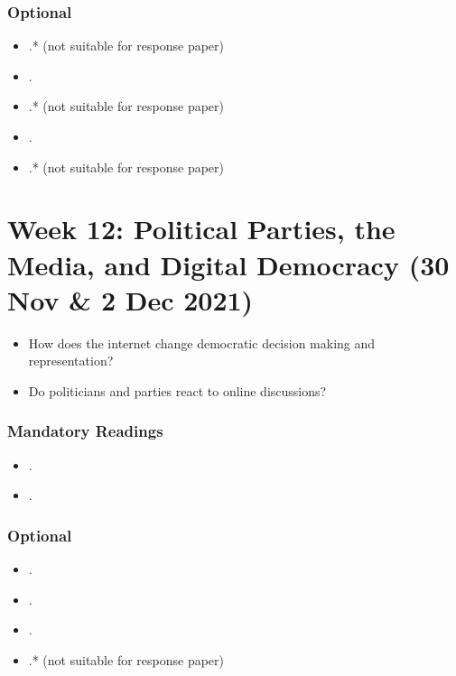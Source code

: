 \documentclass[abstract=on,parskip=full,headings=standardclasses,fontsize=11pt,paper=a4]{scrartcl}
\begin{document}
\subsubsection*{Optional}
\begin{itemize}
\item {}.* (not suitable for response paper)
\item {}.
\item {}.* (not suitable for response paper)
\item {}.
\item {}.* (not suitable for response paper)
\end{itemize}



\section{Week 12: Political Parties, the Media, and Digital Democracy (30 Nov \& 2 Dec 2021)}


\begin{itemize}
\renewcommand\labelitemi{--}
\item How does the internet change democratic decision making and representation?
\item Do politicians and parties react to online discussions?
\end{itemize}

\subsubsection*{Mandatory Readings}
\begin{itemize}
\item {}.
\item {}.
\end{itemize}


\subsubsection*{Optional}
\begin{itemize}
\item {}.
\item {}.
\item {}.
\item {}.* (not suitable for response paper)
\end{itemize}


\end{document}
